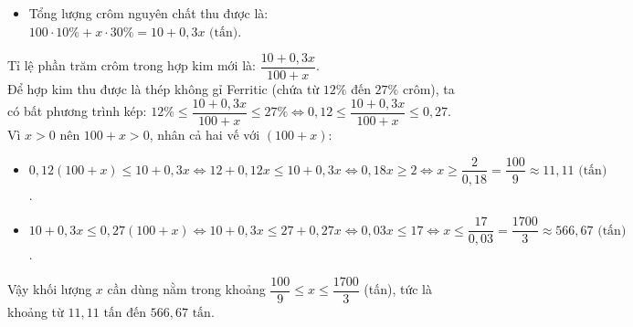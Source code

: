 \begin{bt}
{\begin{enumerate}[a)]
\begin{itemize}
		\item Tổng lượng crôm nguyên chất thu được là: $100\cdot 10\% + x\cdot 30\% = 10 + 0{,}3x\text{ (tấn)}$.
	\end{itemize}
	Tỉ lệ phần trăm crôm trong hợp kim mới là: $\dfrac{10 + 0{,}3x}{100 + x}$.\\
	Để hợp kim thu được là thép không gỉ Ferritic (chứa từ $12\%$ đến $27\%$ crôm), ta có bất phương trình kép:
	$12\% \le \dfrac{10 + 0{,}3x}{100 + x} \le 27\% \Leftrightarrow 0{,}12 \le \dfrac{10 + 0{,}3x}{100 + x} \le 0{,}27$.\\
	Vì $x > 0$ nên $100 + x > 0$, nhân cả hai vế với $(100 + x)$:
	\begin{itemize}
		\item $0{,}12(100 + x) \le 10 + 0{,}3x \Leftrightarrow 12 + 0{,}12x \le 10 + 0{,}3x \Leftrightarrow 0{,}18x \ge 2 \Leftrightarrow x \ge \dfrac{2}{0{,}18} = \dfrac{100}{9} \approx 11{,}11\text{ (tấn)}$.
		\item $10 + 0{,}3x \le 0{,}27(100 + x) \Leftrightarrow 10 + 0{,}3x \le 27 + 0{,}27x \Leftrightarrow 0{,}03x \le 17 \Leftrightarrow x \le \dfrac{17}{0{,}03} = \dfrac{1700}{3} \approx 566{,}67\text{ (tấn)}$.
	\end{itemize}
	Vậy khối lượng $x$ cần dùng nằm trong khoảng $\dfrac{100}{9} \le x \le \dfrac{1700}{3}$ (tấn), tức là khoảng từ $11{,}11\text{ tấn}$ đến $566{,}67\text{ tấn}$.
\end{enumerate}
}
\end{bt}

